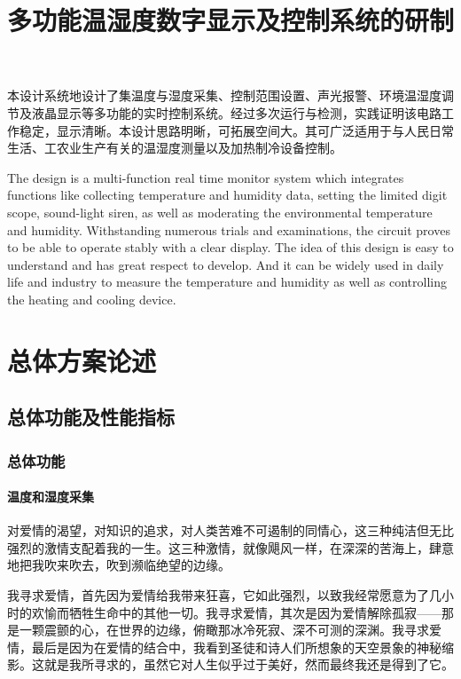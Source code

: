\documentclass{thxythesis}
\title{多功能温湿度数字显示及控制系统的研制}
\institute{}
\begin{document}
\makecoverandfaith

\begin{Abstract}
本设计系统地设计了集温度与湿度采集、控制范围设置、声光报警、环境温湿度调节及液晶显示等多功能的实时控制系统。经过多次运行与检测，实践证明该电路工作稳定，显示清晰。本设计思路明晰，可拓展空间大。其可广泛适用于与人民日常生活、工农业生产有关的温湿度测量以及加热制冷设备控制。

\end{Abstract}

\begin{Abstract}[e]
The design is a multi-function real time monitor system which integrates functions like collecting temperature and humidity data, setting the limited digit scope, sound-light siren, as well as moderating the environmental temperature and humidity. Withstanding numerous trials and examinations, the circuit proves to be able to operate stably with a clear display. The idea of this design  is easy to understand and has great respect to develop. And it can be widely used in daily life and industry to measure the temperature and humidity as well as controlling the heating and cooling device.

\end{Abstract}

\contents

\chapter{总体方案论述}
\section{总体功能及性能指标}
\subsection{总体功能}
\subsubsection{温度和湿度采集}
对爱情的渴望，对知识的追求，对人类苦难不可遏制的同情心，这三种纯洁但无比强烈的激情支配着我的一生。这三种激情，就像飓风一样，在深深的苦海上，肆意地把我吹来吹去，吹到濒临绝望的边缘。

我寻求爱情，首先因为爱情给我带来狂喜，它如此强烈，以致我经常愿意为了几小时的欢愉而牺牲生命中的其他一切。我寻求爱情，其次是因为爱情解除孤寂——那是一颗震颤的心，在世界的边缘，俯瞰那冰冷死寂、深不可测的深渊。我寻求爱情，最后是因为在爱情的结合中，我看到圣徒和诗人们所想象的天空景象的神秘缩影。这就是我所寻求的，虽然它对人生似乎过于美好，然而最终我还是得到了它。
\end{document}
